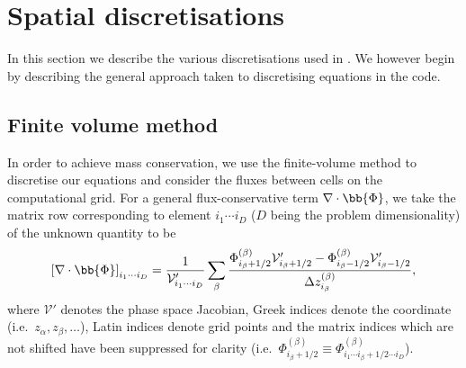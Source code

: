 \documentclass{notes}
\newcommand{\Vp}{\mathcal{V}'}
\begin{document}
    \section{Spatial discretisations}
    In this section we describe the various discretisations used in \DREAM. We
    however begin by describing the general approach taken to discretising
    equations in the code.

    \subsection{Finite volume method}
    In order to achieve mass conservation, we use the finite-volume method to
    discretise our equations and consider the fluxes between cells on the
    computational grid. For a general flux-conservative term
    $\nabla\cdot\bb{\Phi}$, we take the matrix row corresponding to element
    $i_1\cdots i_D$ ($D$ being the problem dimensionality) of the unknown
    quantity to be
    \begin{equation}
        \left[ \nabla\cdot\bb{\Phi} \right]_{i_1\cdots i_D}  =
            \frac{1}{\Vp_{i_1\cdots i_D}}\sum_\beta \frac{
                \Phi^{(\beta)}_{i_\beta+1/2} \Vp_{i_\beta+1/2} -
                \Phi^{(\beta)}_{i_\beta-1/2} \Vp_{i_\beta-1/2}
            }{\Delta z^{(\beta)}_{i_\beta}},
    \end{equation}
    where $\Vp$ denotes the phase space Jacobian, Greek indices denote the
    coordinate (i.e.\ $z_\alpha, z_\beta, \ldots$), Latin indices denote grid
    points and the matrix indices which are not shifted have been suppressed for
    clarity (i.e.\
    $\Phi^{(\beta)}_{i_\beta+1/2}\equiv\Phi^{(\beta)}_{i_1\cdots i_\beta+1/2\cdots i_D}$).
\end{document}
